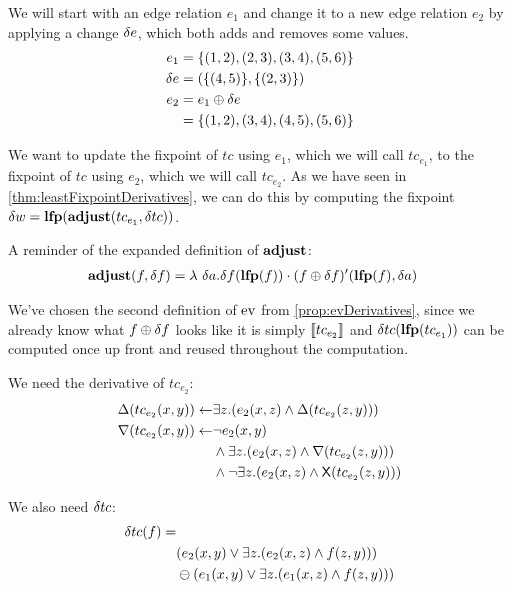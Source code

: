 We will start with an edge relation $e_1$ and change it to a new edge relation
$e_2$ by applying a change $\delta e$, which both adds and removes some values.
\begin{align*}
  e_1 &= \{(1,2), (2,3), (3,4), (5,6) \}\\
  \delta e &= (\{(4,5)\}, \{(2,3)\})\\
  e_2 &= e_1 \oplus \delta e\\
      &=\{ (1,2), (3,4), (4,5), (5,6) \}
\end{align*}

We want to update the fixpoint of $tc$ using $e_1$, which we will call
$tc_{e_1}$,  to the fixpoint of $tc$ using $e_2$, which we will call $tc_{e_2}$.
As we have seen in \cref{thm:leastFixpointDerivatives},
we can do this by computing the fixpoint $\delta w = \mathbf{lfp}(\mathbf{adjust}(tc_{e_1}, \delta tc))$. 

A reminder of the expanded definition of $\mathbf{adjust}$:
\begin{align*}
  \mathbf{adjust}(f, \delta f) &= \lambda\ \delta a. \delta f(\mathbf{lfp}(f)) \cdot (f \oplus \delta f)'(\mathbf{lfp}(f), \delta a)
\end{align*}

We've chosen the second definition of $\operatorname{ev}$ from \cref{prop:evDerivatives}, since
we already know what $f \oplus \delta f$ looks like \textemdash{} it is simply
$\llbracket tc_{e_2} \rrbracket$ \textemdash{} and $\delta tc(\mathbf{lfp}(tc_{e_1}))$ can be
computed once up front and reused throughout the computation.

We need the derivative of $tc_{e_2}$:
\begin{align*}
  \Delta(tc_{e_2}(x, y)) \leftarrow & \exists z. (e_2(x,z) \wedge \Delta(tc_{e_2}(z, y)))\\
  \nabla(tc_{e_2}(x, y)) \leftarrow & \neg e_2(x, y)\\
    &\wedge
    \exists z . (e_2(x, z) \wedge \nabla(tc_{e_2}(z, y)))\\
    &\wedge
    \neg \exists z . (e_2(x, z) \wedge {\mathsf X}(tc_{e_2}(z,y)))
\end{align*}

We also need $\delta tc$:
\begin{align*}
  \delta tc(f) = &\\
  &(e_2(x,y) \vee \exists z . (e_2(x,z) \wedge f(z,y))) \\
  &\ominus (e_1(x,y) \vee \exists z . (e_1(x,z) \wedge f(z,y)))
\end{align*}

